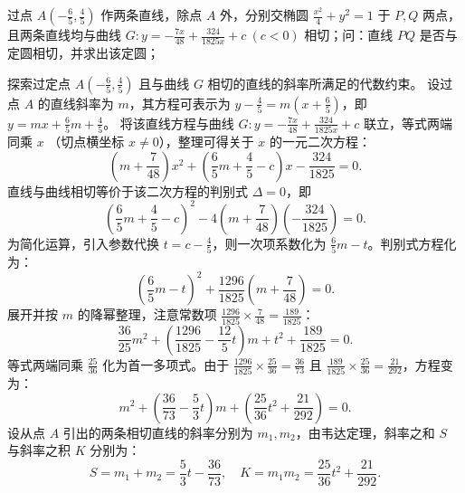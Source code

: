 \begin{solution}
\end{solution}


\begin{example}
过点 \(A\left(-\frac{6}{5},\frac{4}{5}\right)\) 作两条直线，除点 \(A\) 外，分别交椭圆 \(\frac{x^2}{4} + y^2 = 1\) 于 \(P,Q\) 两点，且两条直线均与曲线 \(G: y = -\frac{7x}{48} + \frac{324}{1825x} + c\ (c < 0)\) 相切；问：直线 \(PQ\) 是否与定圆相切，并求出该定圆；
\end{example}
\begin{solution}
探索过定点 $A\left(-\frac{6}{5}, \frac{4}{5}\right)$ 且与曲线 $G$ 相切的直线的斜率所满足的代数约束。
设过点 $A$ 的直线斜率为 $m$，其方程可表示为 $y - \frac{4}{5} = m\left(x + \frac{6}{5}\right)$，即 $y = mx + \frac{6}{5}m + \frac{4}{5}$。
将该直线方程与曲线 $G: y = -\frac{7x}{48} + \frac{324}{1825x} + c$ 联立，等式两端同乘 $x$ （切点横坐标 $x \neq 0$），整理可得关于 $x$ 的一元二次方程：
\[ \left(m + \frac{7}{48}\right)x^2 + \left(\frac{6}{5}m + \frac{4}{5} - c\right)x - \frac{324}{1825} = 0. \]
直线与曲线相切等价于该二次方程的判别式 $\Delta = 0$，即
\[ \left(\frac{6}{5}m + \frac{4}{5} - c\right)^2 - 4\left(m + \frac{7}{48}\right)\left(-\frac{324}{1825}\right) = 0. \]
为简化运算，引入参数代换 $t = c - \frac{4}{5}$，则一次项系数化为 $\frac{6}{5}m - t$。判别式方程化为：
\[ \left(\frac{6}{5}m - t\right)^2 + \frac{1296}{1825}\left(m + \frac{7}{48}\right) = 0. \]
展开并按 $m$ 的降幂整理，注意常数项 $\frac{1296}{1825} \times \frac{7}{48} = \frac{189}{1825}$：
\[ \frac{36}{25}m^2 + \left( \frac{1296}{1825} - \frac{12}{5}t \right)m + t^2 + \frac{189}{1825} = 0. \]
等式两端同乘 $\frac{25}{36}$ 化为首一多项式。由于 $\frac{1296}{1825} \times \frac{25}{36} = \frac{36}{73}$ 且 $\frac{189}{1825} \times \frac{25}{36} = \frac{21}{292}$，方程变为：
\[ m^2 + \left( \frac{36}{73} - \frac{5}{3}t \right)m + \left( \frac{25}{36}t^2 + \frac{21}{292} \right) = 0. \]
设从点 $A$ 引出的两条相切直线的斜率分别为 $m_1, m_2$，由韦达定理，斜率之和 $S$ 与斜率之积 $K$ 分别为：
\[ S = m_1 + m_2 = \frac{5}{3}t - \frac{36}{73}, \quad K = m_1 m_2 = \frac{25}{36}t^2 + \frac{21}{292}. \]


\end{solution}
